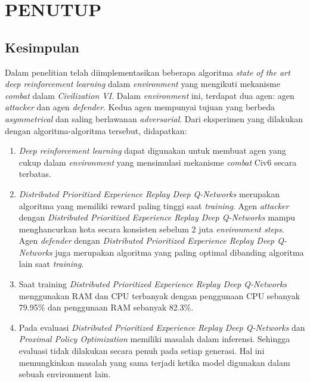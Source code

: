 \chapter{PENUTUP}
\label{chap:penutup}


\section{Kesimpulan}
\label{sec:kesimpulan}

Dalam penelitian telah diimplementasikan beberapa algoritma \emph{state of the art} \emph{deep reinforcement learning} dalam \emph{environment}
yang mengikuti mekanisme \emph{combat} dalam \emph{Civilization VI}.
Dalam \emph{environment} ini, terdapat dua agen: agen \emph{attacker} dan agen \emph{defender}.
Kedua agen mempunyai tujuan yang berbeda \emph{asymmetrical} dan saling berlawanan \emph{adversarial}.
Dari eksperimen yang dilakukan dengan algoritma-algoritma tersebut, didapatkan:

\begin{enumerate}[nolistsep]

  \item \emph{Deep reinforcement learning} dapat digunakan untuk membuat agen yang cukup dalam \emph{environment} yang mensimulasi mekanisme \emph{combat}
  Civ6 secara terbatas.

  \item \emph{Distributed Prioritized Experience Replay Deep Q-Networks} merupakan algoritma yang memiliki reward paling tinggi saat \emph{training}. Agen \emph{attacker} dengan \emph{Distributed Prioritized Experience Replay Deep Q-Networks} mampu
  menghancurkan kota secara konsisten sebelum 2 juta \emph{environment steps}.
  Agen \emph{defender} dengan \emph{Distributed Prioritized Experience Replay Deep Q-Networks} juga merupakan algoritma yang paling optimal
  dibanding algoritma lain saat \emph{training}.

  \item Saat training \emph{Distributed Prioritized Experience Replay Deep Q-Networks} menggunakan RAM dan CPU terbanyak dengan penggunaan CPU sebanyak 79.95\% dan penggunaan
  RAM sebanyak 82.3\%.

  \item Pada evaluasi \emph{Distributed Prioritized Experience Replay Deep Q-Networks} dan \emph{Proximal Policy Optimization} memiliki masalah dalam inferensi.
  Sehingga evaluasi tidak dilakukan secara penuh pada setiap generasi. Hal ini memungkinkan masalah yang sama terjadi ketika model digunakan dalam sebuah environment lain.

\end{enumerate}

